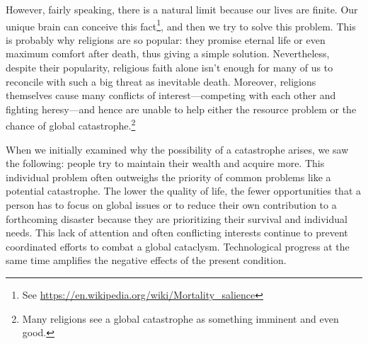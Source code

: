 \documentclass[12pt]{report}
\begin{document}
\noindent However, fairly speaking, there is a natural limit because our lives are finite. Our unique brain can conceive this fact\footnote{See \url{https://en.wikipedia.org/wiki/Mortality_salience}}, and then we try to solve this problem. This is probably why religions are so popular: they promise eternal life or even maximum comfort after death, thus giving a simple solution. Nevertheless, despite their popularity, religious faith alone isn’t enough for many of us to reconcile with such a big threat as inevitable death. Moreover, religions themselves cause many conflicts of interest\thinspace---\thinspace competing with each other and fighting heresy\thinspace---\thinspace and hence are unable to help either the resource problem or the chance of global catastrophe.\footnote{Many religions see a global catastrophe as something imminent and even good.}

\noindent When we initially examined why the possibility of a catastrophe arises, we saw the following: people try to maintain their wealth and acquire more. This individual problem often outweighs the priority of common problems like a potential catastrophe. The lower the quality of life, the fewer opportunities that a person has to focus on global issues or to reduce their own contribution to a forthcoming disaster because they are prioritizing their survival and individual needs. This lack of attention and often conflicting interests continue to prevent coordinated efforts to combat a global cataclysm. Technological progress at the same time amplifies the negative effects of the present condition.
\end{document}
